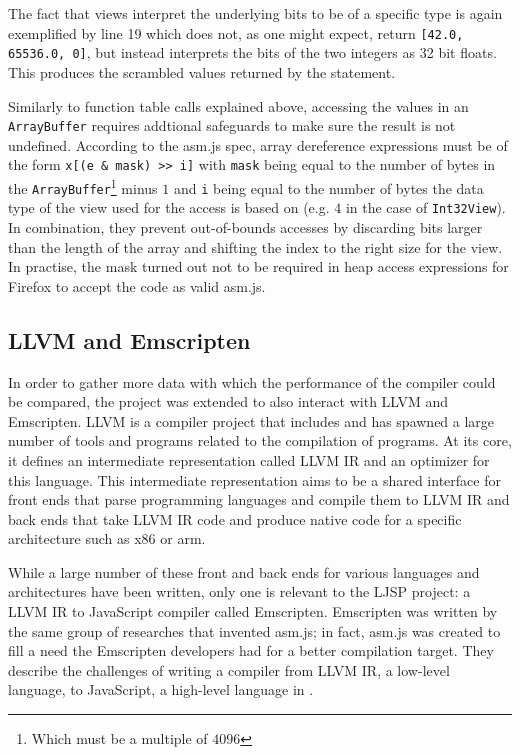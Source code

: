 \documentclass[11pt]{report}
\begin{document}
The fact that views interpret the underlying bits to be of a specific type is again exemplified by line 19 which does not, as one might expect, return \texttt{[42.0, 65536.0, 0]}, but instead interprets the bits of the two integers as 32 bit floats. This produces the scrambled values returned by the statement.

Similarly to function table calls explained above, accessing the values in an \texttt{ArrayBuffer} requires addtional safeguards to make sure the result is not undefined. According to the asm.js spec, array dereference expressions must be of the form \texttt{x[(e \& mask) {>}> i]} with \texttt{mask} being equal to the number of bytes in the \texttt{ArrayBuffer}\footnote{Which must be a multiple of $4096$} minus $1$ and \texttt{i} being equal to the number of bytes the data type of the view used for the access is based on (e.g. $4$ in the case of \texttt{Int32View}). In combination, they prevent out-of-bounds accesses by discarding bits larger than the length of the array and shifting the index to the right size for the view. In practise, the mask turned out not to be required in heap access expressions for Firefox to accept the code as valid asm.js.

\subsection{LLVM and Emscripten}
In order to gather more data with which the performance of the compiler could be compared, the project was extended to also interact with LLVM and Emscripten. LLVM is a compiler project that includes and has spawned a large number of tools and programs related to the compilation of programs. At its core, it defines an intermediate representation called LLVM IR and an optimizer for this language. This intermediate representation aims to be a shared interface for front ends that parse programming languages and compile them to LLVM IR and back ends that take LLVM IR code and produce native code for a specific architecture such as x86 or arm. 

While a large number of these front and back ends for various languages and architectures have been written, only one is relevant to the LJSP project: a LLVM IR to JavaScript compiler called Emscripten. Emscripten was written by the same group of researches that invented asm.js; in fact, asm.js was created to fill a need the Emscripten developers had for a better compilation target. They describe the challenges of writing a compiler from LLVM IR, a low-level language, to JavaScript, a high-level language in \cite{emscriptenpapar}.
\end{document}
